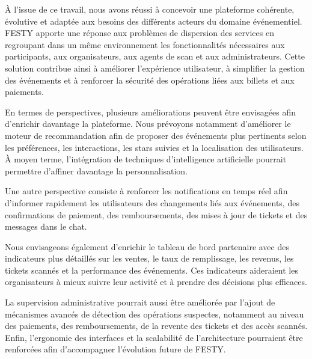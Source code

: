 À l’issue de ce travail, nous avons réussi à concevoir une plateforme cohérente, évolutive et adaptée aux besoins des différents acteurs du domaine événementiel. FESTY apporte une réponse aux problèmes de dispersion des services en regroupant dans un même environnement les fonctionnalités nécessaires aux participants, aux organisateurs, aux agents de scan et aux administrateurs. Cette solution contribue ainsi à améliorer l’expérience utilisateur, à simplifier la gestion des événements et à renforcer la sécurité des opérations liées aux billets et aux paiements.

En termes de perspectives, plusieurs améliorations peuvent être envisagées afin d’enrichir davantage la plateforme. Nous prévoyons notamment d’améliorer le moteur de recommandation afin de proposer des événements plus pertinents selon les préférences, les interactions, les stars suivies et la localisation des utilisateurs. À moyen terme, l’intégration de techniques d’intelligence artificielle pourrait permettre d’affiner davantage la personnalisation.

Une autre perspective consiste à renforcer les notifications en temps réel afin d’informer rapidement les utilisateurs des changements liés aux événements, des confirmations de paiement, des remboursements, des mises à jour de tickets et des messages dans le chat.

Nous envisageons également d’enrichir le tableau de bord partenaire avec des indicateurs plus détaillés sur les ventes, le taux de remplissage, les revenus, les tickets scannés et la performance des événements. Ces indicateurs aideraient les organisateurs à mieux suivre leur activité et à prendre des décisions plus efficaces.

La supervision administrative pourrait aussi être améliorée par l’ajout de mécanismes avancés de détection des opérations suspectes, notamment au niveau des paiements, des remboursements, de la revente des tickets et des accès scannés. Enfin, l’ergonomie des interfaces et la scalabilité de l’architecture pourraient être renforcées afin d’accompagner l’évolution future de FESTY.